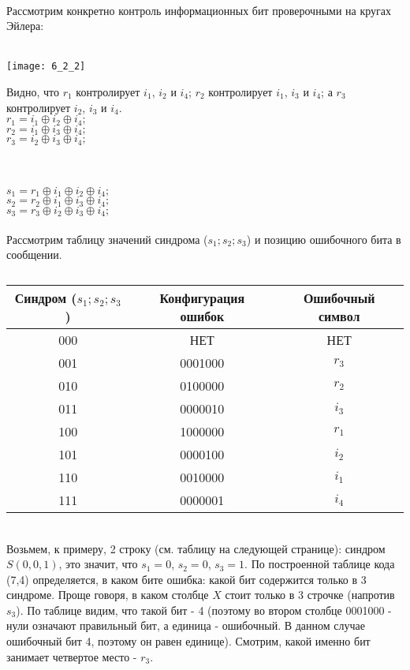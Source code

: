 \\Рассмотрим конкретно контроль информационных бит проверочными на кругах Эйлера:
\\\\
\begin{minipage}[l]{3.5cm}
\texttt{[image: 6\_2\_2]}
\end{minipage}
\begin{minipage}[r]{9cm}
Видно, что $r_1$ контролирует $i_1$, $i_2$ и $i_4$; $r_2$ контролирует $i_1$, $i_3$ и $i_4$; а $r_3$ контролирует $i_2$, $i_3$ и $i_4$.
\\$r_1 = i_1 \oplus i_2 \oplus i_4;$
\\$r_2 = i_1 \oplus i_3 \oplus i_4;$
\\$r_3 = i_2 \oplus i_3 \oplus i_4;$
\end{minipage}
\\
\\$s_1 = r_1 \oplus i_1 \oplus i_2 \oplus i_4;$
\\$s_2 = r_2 \oplus i_1 \oplus i_3 \oplus i_4;$
\\$s_3 = r_3 \oplus i_2 \oplus i_3 \oplus i_4;$
\\
\\Рассмотрим таблицу значений синдрома ($s_1;s_2;s_3$) и позицию ошибочного бита в сообщении.
\begin{table}[h]
\caption{}
\begin{tabular}{|c|c|c|}
\hline
Синдром ($s_1;s_2;s_3$) & Конфигурация ошибок & Ошибочный символ\\
\hline
000 & НЕТ & НЕТ \\
001 & 0001000 & $r_3$ \\
010 & 0100000 & $r_2$ \\
011 & 0000010 & $i_3$ \\
100 & 1000000 & $r_1$ \\
101 & 0000100 & $i_2$ \\
110 & 0010000 & $i_1$ \\
111 & 0000001 & $i_4$ \\
\hline
\end{tabular}
\end{table}\\
Возьмем, к примеру, 2 строку (см. таблицу на следующей странице): синдром $S(0,0,1)$, это значит, что $s_1 = 0$, $s_2 = 0$, $s_3 = 1$. По построенной таблице кода (7,4) определяется, в каком бите ошибка: какой бит содержится только в 3 синдроме. Проще говоря, в каком столбце $X$ стоит только в 3 строчке (напротив $s_3$). По таблице видим, что такой бит - 4 (поэтому во втором столбце 0001000 - нули означают правильный бит, а единица - ошибочный. В данном случае ошибочный бит 4, поэтому он равен единице). Смотрим, какой именно бит занимает четвертое место - $r_3$.
